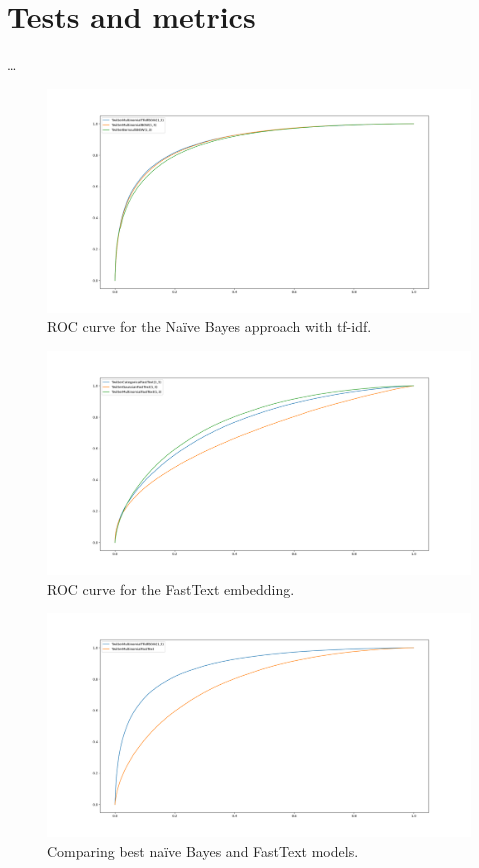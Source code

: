 \section*{Tests and metrics}

\dots

\begin{figure}[h!t]
    \centering
    \includegraphics[scale=0.25]{../experiments/plots/TwitterBOWTfidf}
    \caption{ROC curve for the Na\"ive Bayes approach with tf-idf.}
    \label{fig:ROCNB}        
\end{figure}

\begin{figure}[h!t]
    \centering
    \includegraphics[scale=0.25]{../experiments/plots/TwitterFastText}
    \caption{ROC curve for the FastText embedding.}
    \label{fig:ROCFT}
\end{figure}

\begin{figure}[h!t]
    \centering
    \includegraphics[scale=0.25]{../experiments/plots/BOWFastText}
    \caption{Comparing best na\"ive Bayes and FastText models.}
    \label{fig:BOWFT}
\end{figure}

